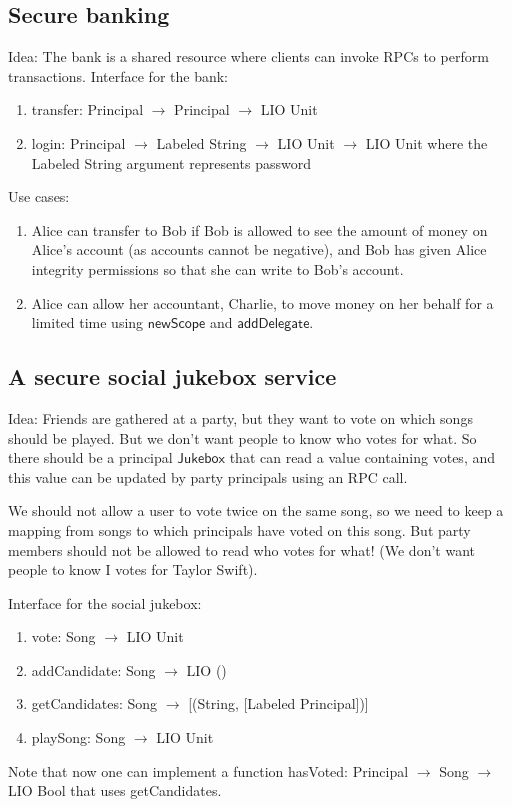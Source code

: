 \documentclass[conference]{IEEEtran}
\begin{document}
\subsection{Secure banking}
Idea: The bank is a shared resource where clients can invoke RPCs to perform transactions.
Interface for the bank:
\begin{enumerate}
    \item \textsf{transfer: Principal $\rightarrow$ Principal $\rightarrow$ LIO Unit}
    \item \textsf{login: Principal $\rightarrow$ Labeled String $\rightarrow$ LIO Unit $\rightarrow$ LIO Unit} where the Labeled String argument represents password
\end{enumerate}
Use cases:
\begin{enumerate}
    \item Alice can transfer to Bob if Bob is allowed to see the amount of money on Alice's account (as accounts cannot be negative), and Bob has given Alice integrity permissions so that she can write to Bob's account. 
    \item Alice can allow her accountant, Charlie, to move money on her behalf for a limited time using $\mathsf{newScope}$ and $\mathsf{addDelegate}$.
\end{enumerate}

\subsection{A secure social jukebox service}
Idea: Friends are gathered at a party, but they want to vote on which songs should be played. But we don't want people to know who votes for what. So there should be a principal $\mathsf{Jukebox}$ that can read a value containing votes, and this value can be updated by party principals using an RPC call.

We should not allow a user to vote twice on the same song, so we need to keep a mapping from songs to which principals have voted on this song. But party members should not be allowed to read who votes for what! (We don't want people to know I votes for Taylor Swift).

Interface for the social jukebox:
\begin{enumerate}
    \item \textsf{vote: Song $\rightarrow$ LIO Unit}
    \item \textsf{addCandidate: Song $\rightarrow$ LIO ()}
    \item \textsf{getCandidates: Song $\rightarrow$ [(String, [Labeled Principal])]}
    \item \textsf{playSong: Song $\rightarrow$ LIO Unit}
\end{enumerate}
Note that now one can implement a function \textsf{hasVoted: Principal $\rightarrow$ Song $\rightarrow$ LIO Bool} that uses \textsf{getCandidates}.
\end{document}

